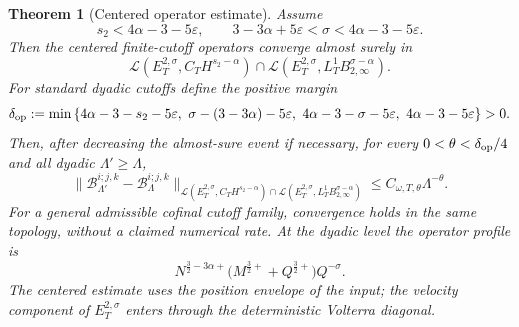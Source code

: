 \documentclass[10pt]{amsart}
\numberwithin{equation}{section}
\theoremstyle{plain}
\newtheorem{theorem}{Theorem}[section]
\theoremstyle{definition}
\theoremstyle{remark}
\newcommand{\Btwo}{B_{2,\infty}}
\newcommand{\eps}{\varepsilon}
\begin{document}
\begin{theorem}[Centered operator estimate]\label{thm:pathwise-fluct}
Assume
\begin{equation}\label{eq:pathwise-fluct-conditions}
        s_2<4\alpha-3-5\eps,
        \qquad
        3-3\alpha+5\eps<\sigma<4\alpha-3-5\eps.
\end{equation}
Then the centered finite-cutoff operators converge almost surely in
\begin{equation}\label{eq:pathwise-fluct-bound}
\mathcal L(E_T^{2,\sigma},C_TH^{s_2-\alpha})
\cap
\mathcal L(E_T^{2,\sigma},L_T^1\Btwo^{\sigma-\alpha}).
\end{equation}
For standard dyadic cutoffs define the positive margin
\begin{equation}\label{eq:centered-cutoff-margin}
\delta_{\rm op}:=\min\left\{
4\alpha-3-s_2-5\eps,
\ \sigma-(3-3\alpha)-5\eps,
\ 4\alpha-3-\sigma-5\eps,
\ 4\alpha-3-5\eps
\right\}>0.
\end{equation}
Then, after decreasing the almost-sure event if necessary, for every
$0<\theta<\delta_{\rm op}/4$ and all dyadic $\Lambda'\ge\Lambda$,
\begin{equation}\label{eq:centered-cutoff-rate}
 \|\mathcal B_{\Lambda'}^{i;j,k}-\mathcal B_{\Lambda}^{i;j,k}\|_{\mathcal L(E_T^{2,\sigma},C_TH^{s_2-\alpha})
 \cap\mathcal L(E_T^{2,\sigma},L_T^1\Btwo^{\sigma-\alpha})}
 \le C_{\omega,T,\theta}\Lambda^{-\theta}.
\end{equation}
For a general admissible cofinal cutoff family, convergence holds in the same topology, without a claimed numerical rate.
At the dyadic level the operator profile is
\[
        N^{\frac32-3\alpha+}\bigl(M^{\frac32+}+Q^{\frac32+}\bigr)Q^{-\sigma}.
\]
The centered estimate uses the position envelope of the input; the velocity component of $E_T^{2,\sigma}$ enters through the deterministic Volterra diagonal.
\end{theorem}
\end{document}
